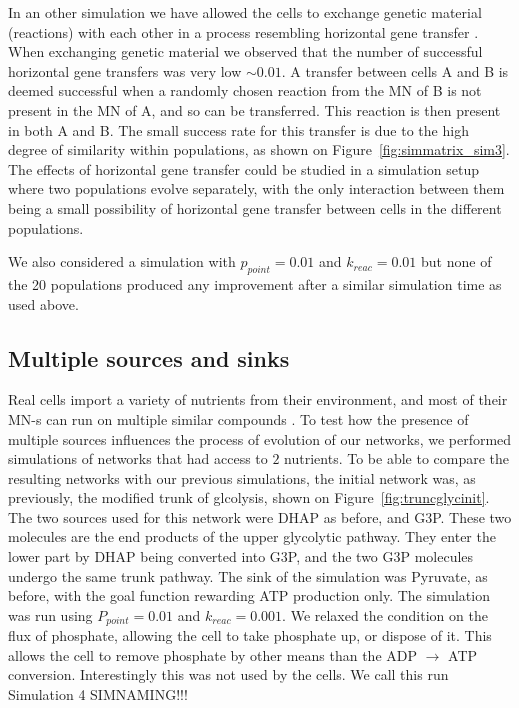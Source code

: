 \documentclass[a4paper,12pt]{article}
\begin{document}
In an other simulation we have allowed the cells to exchange genetic material (reactions) with each other in a process resembling horizontal gene transfer \cite{horizontalgenetransfer}. When exchanging genetic material we observed that the number of successful horizontal gene transfers was very low $\sim 0.01$. A transfer between cells A and B is deemed successful when a randomly chosen reaction from the MN of B is not present in the MN of A, and so can be transferred. This reaction is then present in both A and B. The small success rate for this transfer is due to the high degree of similarity within populations, as shown on Figure~\ref{fig:simmatrix_sim3}. The effects of horizontal gene transfer could be studied in a simulation setup where two populations evolve separately, with the only interaction between them being a small possibility of horizontal gene transfer between cells in the different populations. %

We also considered a simulation with $p_{point}=0.01$ and $k_{reac}=0.01$ but none of the 20 populations produced any improvement after a similar simulation time as used above. 




\subsection{Multiple sources and sinks}
\label{sub:multiple_sources_and_sinks}

Real cells import a variety of nutrients from their environment, and most of their MN-s can run on multiple similar compounds \cite{latent}. To test how the presence of multiple sources influences the process of evolution of our networks, we performed simulations of networks that had access to $2$ nutrients. To be able to compare the resulting networks with our previous simulations, the initial network was, as previously, the modified trunk of glcolysis, shown on Figure~\ref{fig:truncglycinit}. The two sources used for this network were DHAP as before, and G3P. These two molecules are the end products of the upper glycolytic pathway. They enter the lower part by DHAP being converted into G3P, and the two G3P molecules undergo the same trunk pathway. The sink of the simulation was Pyruvate, as before, with the goal function rewarding ATP production only. The simulation was run using $P_{point}=0.01$ and $k_{reac}=0.001$. We relaxed the condition on the flux of phosphate, allowing the cell to take phosphate up, or dispose of it. This allows the cell to remove phosphate by other means than the ADP $\rightarrow$ ATP conversion. Interestingly this was not used by the cells. We call this run Simulation 4 SIMNAMING!!!
\end{document}
